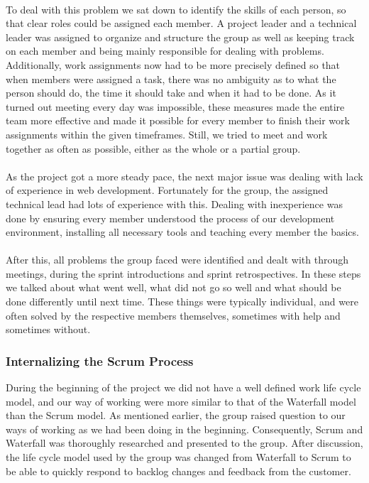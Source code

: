 \paragraph{} To deal with this problem we sat down to identify the skills of each person, so that clear roles could be assigned each member. A project leader and a technical leader was assigned to organize and structure the group as well as keeping track on each member and being mainly responsible for dealing with problems. Additionally, work assignments now had to be more precisely defined so that when members were assigned a task, there was no ambiguity as to what the person should do, the time it should take and when it had to be done. As it turned out meeting every day was impossible, these measures made the entire team more effective and made it possible for every member to finish their work assignments within the given timeframes. Still, we tried to meet and work together as often as possible, either as the whole or a partial group. 
\paragraph{} As the project got a more steady pace, the next major issue was dealing with lack of experience in web development. Fortunately for the group, the assigned technical lead had lots of experience with this. Dealing with inexperience was done by ensuring every member understood the process of our development environment, installing all necessary tools and teaching every member the basics. 
\paragraph{} After this, all problems the group faced were identified and dealt with through meetings, during the sprint introductions and sprint retrospectives. In these steps we talked about what went well, what did not go so well and what should be done differently until next time. These things were typically individual, and were often solved by the respective members themselves, sometimes with help and sometimes without. 
\subsubsection{Internalizing the Scrum Process} During the beginning of the project we did not have a well defined work life cycle model, and our way of working were more similar to that of the Waterfall model than the Scrum model. As mentioned earlier, the group raised question to our ways of working as we had been doing in the beginning. Consequently, Scrum and Waterfall was thoroughly researched and presented to the group. After discussion, the life cycle model used by the group was changed from Waterfall to Scrum to be able to quickly respond to backlog changes and feedback from the customer. 
